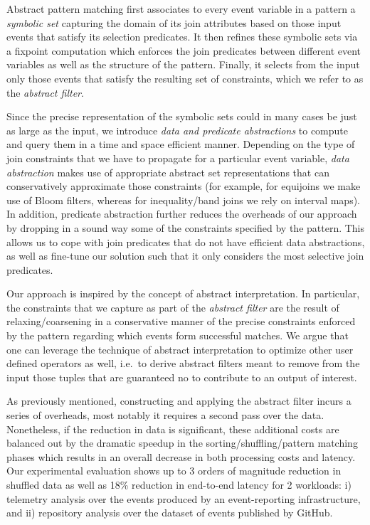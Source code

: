 Abstract pattern matching first associates to every event variable in a pattern 
a {\em symbolic set} capturing the domain of its join attributes based on those 
input events that satisfy its selection predicates.  
It then refines these symbolic sets via a fixpoint computation which enforces 
the join predicates between different event variables as well as the structure 
of the pattern. 
Finally, it selects from the input only those events that satisfy the resulting 
set of constraints, which we refer to as the {\em abstract filter}.  

Since the precise representation of the symbolic sets could in many 
cases be just as large as the input, we introduce {\em data and predicate 
abstractions} to compute and query them in a time and space efficient manner. 
Depending on the type of join constraints that we have to propagate for a 
particular event variable, {\em data abstraction} makes use of appropriate 
abstract set representations that can conservatively approximate those 
constraints (for example, for equijoins we make use of 
Bloom filters\cite{Bloom:1970}, whereas for inequality/band joins we rely on 
interval maps).
In addition, predicate abstraction further reduces the overheads of 
our approach by dropping in a sound way some of the constraints specified by 
the pattern. 
This allows us to cope with join predicates that do not have efficient data 
abstractions, as well as fine-tune our solution such that it only considers the 
most selective join predicates.
      
 
Our approach is inspired by the concept of abstract interpretation.
In particular, the constraints that we capture as part of the {\em abstract 
filter} are the result of relaxing/coarsening in a conservative manner of the 
precise constraints enforced by the pattern regarding which events form 
successful matches. 
We argue that one can leverage the technique of abstract interpretation to 
optimize other user defined operators as well, i.e.\ to derive abstract filters 
meant to remove from the input those tuples that are guaranteed no to 
contribute to an output of interest.


As previously mentioned, constructing and applying the abstract filter incurs a 
series of overheads, most notably it requires a second pass over the data.
Nonetheless, if the reduction in data is significant, these additional costs 
are balanced out by the dramatic speedup in the sorting/shuffling/pattern 
matching phases which results in an overall decrease in both processing costs 
and latency.  
Our experimental evaluation shows up to 3 orders of magnitude reduction in 
shuffled data as well as 18\% reduction in end-to-end latency for 2 workloads:
i) telemetry analysis over the events produced by an event-reporting 
infrastructure, and
ii) repository analysis over the dataset of events published by GitHub.



